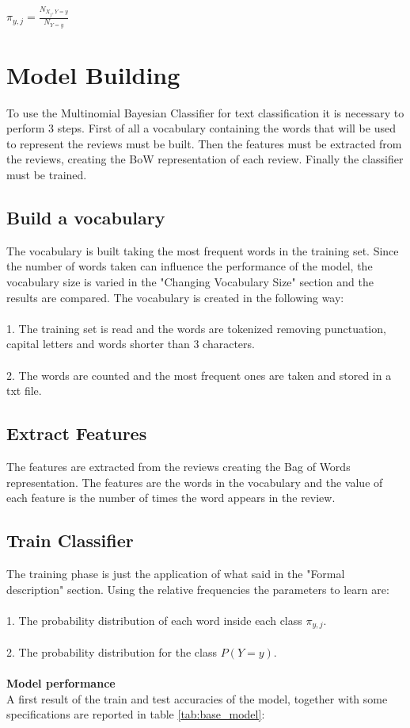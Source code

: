 \documentclass{article}
\begin{document}
    \vspace{0.3cm}\begin{center} $\pi_{y,j} = \frac{N_{X_j, Y=y}}{N_{Y=y}}$ \end{center}\vspace{0.3cm}




\section{Model Building}
To use the Multinomial Bayesian Classifier for text classification it is necessary to perform 3 steps. First of all a vocabulary containing the words that will be used
to represent the reviews must be built. Then the features must be extracted from the reviews, creating the BoW representation of each review. Finally the classifier 
must be trained.

\subsection{Build a vocabulary}
The vocabulary is built taking the most frequent words in the training set. Since the number of words taken can influence the performance of the model, the vocabulary
size is varied in the "Changing Vocabulary Size" section and the results are compared. The vocabulary is created in the following way:\\
\\
1. The training set is read and the words are tokenized removing punctuation, capital letters and words shorter than 3 characters.\\
\\
2. The words are counted and the most frequent ones are taken and stored in a txt file.


\subsection{Extract Features}
The features are extracted from the reviews creating the Bag of Words representation. The features are the words in the vocabulary and the value of each feature is the
number of times the word appears in the review.

\subsection{Train Classifier}
The training phase is just the application of what said in the "Formal description" section. Using the relative frequencies the parameters to learn are:\\
\\
1. The probability distribution of each word inside each class $\pi_{y,j}$.\\
\\
2. The probability distribution for the class $P(Y = y)$.\\
\\
\textbf{Model performance}\\
A first result of the train and test accuracies of the model, together with some specifications are reported in table \ref{tab:base_model}:
\end{document}
